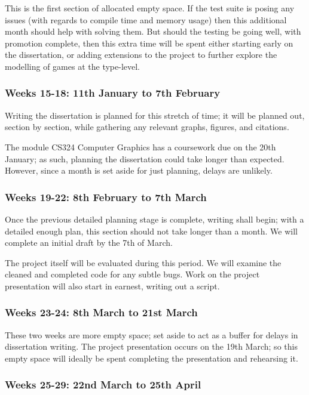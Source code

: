 \documentclass[12pt, a4paper]{scrartcl}
\begin{document}
This is the first section of allocated empty space. If the test suite is posing any issues (with regards to compile time and memory usage) then this additional month should help with solving them. But should the testing be going well, with promotion complete, then this extra time will be spent either starting early on the dissertation, or adding extensions to the project to further explore the modelling of games at the type-level.

\subsubsection{Weeks 15-18: 11th January to 7th February}

Writing the dissertation is planned for this stretch of time; it will be planned out, section by section, while gathering any relevant graphs, figures, and citations.

The module CS324 Computer Graphics has a coursework due on the 20th January; as such, planning the dissertation could take longer than expected. However, since a month is set aside for just planning, delays are unlikely.

\subsubsection{Weeks 19-22: 8th February to 7th March}

Once the previous detailed planning stage is complete, writing shall begin; with a detailed enough plan, this section should not take longer than a month. We will complete an initial draft by the 7th of March.

The project itself will be evaluated during this period. We will examine the cleaned and completed code for any subtle bugs. Work on the project presentation will also start in earnest, writing out a script.

\subsubsection{Weeks 23-24: 8th March to 21st March}

These two weeks are more empty space; set aside to act as a buffer for delays in dissertation writing. The project presentation occurs on the 19th March; so this empty space will ideally be spent completing the presentation and rehearsing it.

\subsubsection{Weeks 25-29: 22nd March to 25th April}
\end{document}
